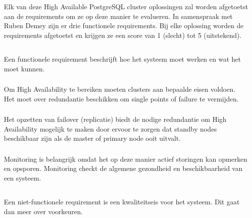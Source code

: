 \section{}
\label{sec:Requirementsanalyse}

Elk van deze High Available PostgreSQL cluster oplossingen zal worden afgetoetst aan de requirements om ze op deze manier te evalueren. In samenspraak met Ruben Demey zijn er drie functionele requirements. Bij elke oplossing worden de requirements afgetoetst en krijgen ze een score van 1 (slecht) tot 5 (uitstekend).


\subsection{}
\label{subsec:Functionele Requirements}
Een functionele requirement beschrijft hoe het systeem moet werken en wat het moet kunnen.

\subsubsection{}
\label{subsubsec:Redundancy}
Om High Availability te bereiken moeten clusters aan bepaalde eisen voldoen. Het moet over redundantie beschikken om single points of failure te vermijden. 


\subsubsection{}
\label{subsubsec:Failover}
Het opzetten van failover (replicatie) biedt de nodige redundantie om High Availability mogelijk te maken door ervoor te zorgen dat standby nodes beschikbaar zijn als de master of primary node ooit uitvalt. 

\subsubsection{}
\label{subsubsec:Monitoring}
Monitoring is belangrijk omdat het op deze manier actief storingen kan opmerken en opsporen. Monitoring checkt de algemene gezondheid en beschikbaarheid van een systeem.


\subsection{}
\label{subsec:Niet-functionele Requirements}
Een niet-functionele requirement is een kwaliteitseis voor het systeem. Dit gaat dan meer over voorkeuren.

